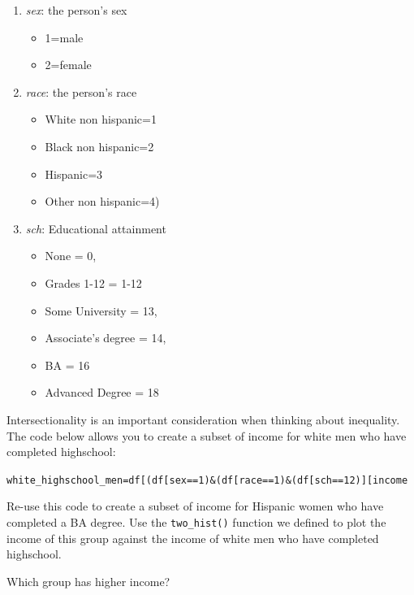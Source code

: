 \documentclass[
  letterpaper,
  DIV=11,
  numbers=noendperiod]{scrreprt}
\providecommand{\tightlist}{%
  \setlength{\itemsep}{0pt}\setlength{\parskip}{0pt}}\usepackage{longtable,booktabs,array}
\begin{document}
\begin{enumerate}
\def\labelenumi{\arabic{enumi}.}
\setcounter{enumi}{2}
\tightlist
\item
  \emph{sex}: the person's sex

  \begin{itemize}
  \tightlist
  \item
    1=male
  \item
    2=female
  \end{itemize}
\item
  \emph{race}: the person's race

  \begin{itemize}
  \tightlist
  \item
    White non hispanic=1
  \item
    Black non hispanic=2
  \item
    Hispanic=3
  \item
    Other non hispanic=4)
  \end{itemize}
\item
  \emph{sch}: Educational attainment

  \begin{itemize}
  \tightlist
  \item
    None = 0,
  \item
    Grades 1-12 = 1-12
  \item
    Some University = 13,
  \item
    Associate's degree = 14,
  \item
    BA = 16
  \item
    Advanced Degree = 18
  \end{itemize}
\end{enumerate}

Intersectionality is an important consideration when thinking about
inequality. The code below allows you to create a subset of income for
white men who have completed highschool:

\texttt{white\_highschool\_men=df{[}(df{[}\textquotesingle{}sex\textquotesingle{}{]}==1)\&(df{[}\textquotesingle{}race\textquotesingle{}{]}==1)\&(df{[}\textquotesingle{}sch\textquotesingle{}{]}==12){]}{[}\textquotesingle{}income\textquotesingle{}{]}}

Re-use this code to create a subset of income for Hispanic women who
have completed a BA degree. Use the \texttt{two\_hist()} function we
defined to plot the income of this group against the income of white men
who have completed highschool.

Which group has higher income?
\end{document}
